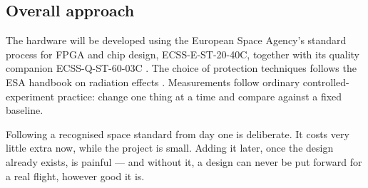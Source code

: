 \documentclass[11pt,a4paper]{article}
\begin{document}
\subsection{Overall approach}

The hardware will be developed using the European Space Agency's standard process
for FPGA and chip design, ECSS-E-ST-20-40C, together with its quality companion
ECSS-Q-ST-60-03C \cite{ecss2040c,ecssq6003c}. The choice of protection techniques
follows the ESA handbook on radiation effects \cite{ecsshb2040a}. Measurements
follow ordinary controlled-experiment practice: change one thing at a time and
compare against a fixed baseline.

Following a recognised space standard from day one is deliberate. It costs very
little extra now, while the project is small. Adding it later, once the design
already exists, is painful --- and without it, a design can never be put forward
for a real flight, however good it is.
\end{document}
